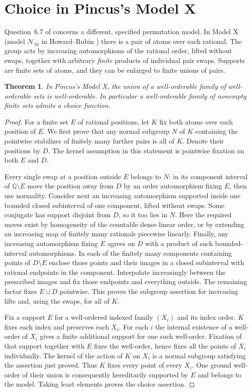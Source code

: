 \documentclass[11pt]{article}
\newtheorem{theorem}{Theorem}
\begin{document}
\section{Choice in Pincus's Model X}
Question~6.7 of \cite{bg} concerns a different, specified permutation model. In Model X (model $\mathcal N_{34}$ in Howard--Rubin \cite[p.~207]{hr}) there is a pair of atoms over each rational. The group acts by increasing automorphisms of the rational order, lifted without swaps, together with arbitrary \emph{finite} products of individual pair swaps. Supports are finite sets of atoms, and they can be enlarged to finite unions of pairs.
\begin{theorem}\label{modelx}
In Pincus's Model X, the union of a well-orderable family of well-orderable sets is well-orderable. In particular a well-orderable family of nonempty finite sets admits a choice function.
\end{theorem}
\begin{proof}
For a finite set $E$ of rational positions, let $K$ fix both atoms over each position of $E$. We first prove that any normal subgroup $N$ of $K$ containing the pointwise stabilizer of finitely many further pairs is all of $K$. Denote their positions by $D$. The kernel assumption in this statement is pointwise fixation on both $E$ and $D$.

Every single swap at a position outside $E$ belongs to $N$: in its component interval of $\mathbb Q\setminus E$ move the position away from $D$ by an order automorphism fixing $E$, then use normality. Consider next an increasing automorphism supported inside one bounded closed subinterval of one component, lifted without swaps. Some conjugate has support disjoint from $D$, so it too lies in $N$. Here the required moves exist by homogeneity of the countable dense linear order, or by extending an increasing map of finitely many rationals piecewise linearly. Finally, any increasing automorphism fixing $E$ agrees on $D$ with a product of such bounded-interval automorphisms. In each of the finitely many components containing points of $D\setminus E$ enclose those points and their images in a closed subinterval with rational endpoints in the component. Interpolate increasingly between the prescribed images and fix those endpoints and everything outside. The remaining factor fixes $E\cup D$ pointwise. This proves the subgroup assertion for increasing lifts and, using the swaps, for all of $K$.

Fix a support $E$ for a well-ordered indexed family $(X_i)$ and its index order. $K$ fixes each index and preserves each $X_i$. For each $i$ the internal existence of a well-order of $X_i$ gives a finite additional support for one such well-order. Fixation of that support together with $E$ fixes the well-order, hence fixes all the points of $X_i$ individually. The kernel of the action of $K$ on $X_i$ is a normal subgroup satisfying the assertion just proved. Thus $K$ fixes every point of every $X_i$. One ground well-order of their union is consequently hereditarily supported by $E$ and belongs to the model. Taking least elements proves the choice assertion.
\end{proof}
\end{document}
